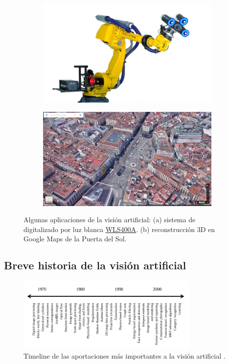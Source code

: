 \begin{figure}
\begin{subfigure}{.5\textwidth}
  \centering
  \includegraphics[width=.9\linewidth]{images/camera.jpg}
  \caption { }
  \label{fig:apps1a}
\end{subfigure}%
\begin{subfigure}{.5\textwidth}
  \centering
  \includegraphics[width=.9\linewidth]{images/maps.jpg}
  \caption { }
  \label{fig:apps1b}
\end{subfigure}
\caption{Algunas aplicaciones de la visión artificial: (a) sistema de digitalizado por luz blanca \href{http://www.hexagonmi.com/es-ES/products/white-light-scanner-systems/hexagon-metrology-wls400a}{WLS400A}. (b) reconstrucción 3D en Google Maps de la Puerta del Sol. }
\label{fig:applications}
\end{figure}

\subsection{Breve historia de la visión artificial}

\begin{figure}[H]
	\centering
	\includegraphics[width=0.8\textwidth]{images/timeline}
	\caption{Timeline de las aportaciones más importantes a la visión artificial \cite{book:szeliski}.}
\end{figure}


